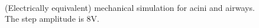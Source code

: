 \begin{figure}[]\centering
  \\
  \caption{(Electrically equivalent) mechanical simulation for acini
    and airways.  The step amplitude is 8V.}
  \label{fig:mechanical_results_8}
\end{figure}

